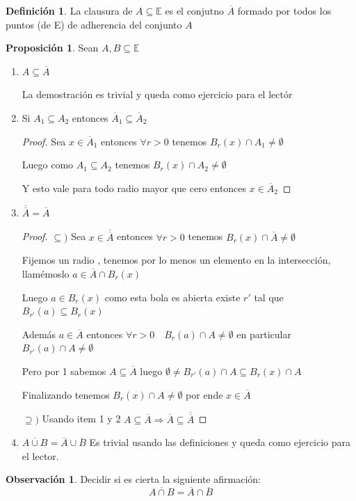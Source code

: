 \documentclass[12pt]{article}
\newcommand{\E}{\mathbb{E}}
\newcommand{\Ra}{\Rightarrow}
\newcommand{\ol}{\overline}
\theoremstyle{definition}
\newtheorem{definition}{Definición}[section]
\newtheorem*{remark}{Observación}
\newtheorem{prop}{Proposición}
\begin{document}
\begin{definition}
  La clausura de $A \subseteq \E$ es el conjutno $\ol A$ formado por todos los puntos (de E) de adherencia del conjunto $A$
\end{definition}
\newpage
\begin{prop} Sean $A,B \subseteq \E$
  \begin{enumerate}
    \item $A \subseteq \ol A$

La demostración es trivial y queda como ejercicio para el lectór
    \item Si $A_{1} \subseteq A_{2}$ entonces $\ol A_{1} \subseteq \ol A_{2}$
      \begin{proof}
	Sea $x \in \ol A_{1}$ entonces $\forall r>0$ tenemos $B_{r}(x) \cap A_{1} \neq \emptyset$ 

	Luego como $A_{1} \subseteq A_{2}$ tenemos $B_{r}(x) \cap A_{2} \neq \emptyset$

	Y esto vale para todo radio mayor que cero entonces $x \in \ol A_{2}$
      \end{proof}
    \item $\ol{\ol A} = \ol A$
      \begin{proof}
      $\subseteq )$ Sea $x \in \ol{\ol A}$ entonces $\forall r>0$ tenemos $B_{r}(x) \cap  \ol A \neq \emptyset$

Fijemos un radio , tenemos por lo menos un elemento en la intersección, llamémoslo $a \in \ol A \cap B_{r}(x)$

Luego $a \in B_{r}(x)$ como esta bola es abierta existe $r'$ tal que $B_{r'}(a) \subseteq B_{r}(x)$

Además $a \in \ol A$ entonces $\forall r > 0 \quad B_{r}(a) \cap A \neq \emptyset$ en particular $B_{r'}(a) \cap A \neq \emptyset$

Pero por 1 sabemos $A \subseteq \ol A$ luego $\emptyset \neq B_{r'}(a) \cap A \subseteq B_{r}(x) \cap  A$ 

Finalizando tenemos $B_{r}(x) \cap A \neq \emptyset$ por ende $x \in \ol A$
      
    $\supseteq )$  Usando item 1 y 2 $A \subseteq \ol A \Ra \ol A \subseteq \ol{\ol A} $
    \end{proof}
    \item $\ol{A \cup B} = \ol A \cup \ol B$
      Es trivial usando las definiciones y queda como ejercicio para el lector.
  \end{enumerate}
\end{prop}
\begin{remark}
Decidir si es cierta la siguiente afirmación:
$$ \ol{A \cap B} = \ol A \cap \ol B$$
\end{remark}
\end{document}
